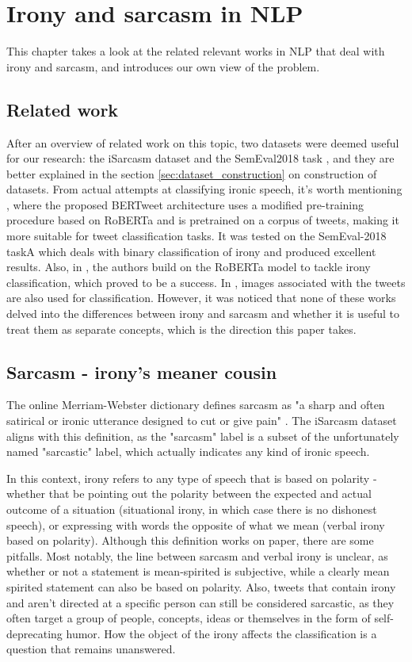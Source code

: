 \documentclass[10pt, a4paper]{article}
\begin{document}
\section{Irony and sarcasm in NLP}
This chapter takes a look at the related relevant works in NLP that deal with irony and sarcasm, and introduces our own view 
of the problem.
\subsection{Related work}
After an overview of related work on this topic, two datasets were deemed useful for our research: the iSarcasm dataset \citep{iSarcasm} and 
the SemEval2018 task \citep{semeval-2018}, and they are better explained in the section \ref{sec:dataset_construction} on construction of 
datasets. From actual attempts at classifying 
ironic speech, it's worth mentioning \citep{bertweet}, where the proposed BERTweet architecture uses a modified pre-training procedure based 
on RoBERTa \citep{roberta} and is pretrained on a corpus of tweets, 
making it more suitable for tweet classification tasks. It was tested on the SemEval-2018 taskA which 
deals with binary classification of irony and produced excellent results. Also, in \citep{transformers4irony-2020}, the authors build on the 
RoBERTa model to tackle 
irony classification, which proved to be a success. In \citep{transformers4irony-2023}, images associated with the tweets are also used 
for classification. However, it was noticed that none of these works delved into the differences between irony and sarcasm and whether it 
is useful to treat them as separate concepts, which is the direction this paper takes.
 
 
\subsection{Sarcasm - irony's meaner cousin}\label{sec:sarcasm_definition}
The online Merriam-Webster dictionary defines sarcasm as "a sharp and often satirical or ironic utterance designed to 
cut or give pain" \citep{mw-dictionary}. The iSarcasm dataset \citep{iSarcasm} aligns with this definition, as 
the "sarcasm" label is a subset of the unfortunately named "sarcastic" label, which actually 
indicates any kind of ironic speech. 

In this context, irony refers to any type of speech that is based on polarity - whether that be pointing out the polarity 
between the expected and actual outcome of a situation (situational irony, in which case there is no dishonest speech), or expressing with words the opposite of what 
we mean (verbal irony based on polarity). Although this definition works on paper, there are some pitfalls. Most notably, 
the line between sarcasm and verbal irony is unclear, as whether or not a statement is mean-spirited is subjective, while 
a clearly mean spirited statement can also be based on polarity. Also, tweets that contain irony and aren’t directed at a 
specific person can still be considered sarcastic, as they often target a group of people, concepts, ideas or themselves 
in the form of self-deprecating humor. How the object of the irony affects the classification is a question that remains unanswered.
\end{document}
